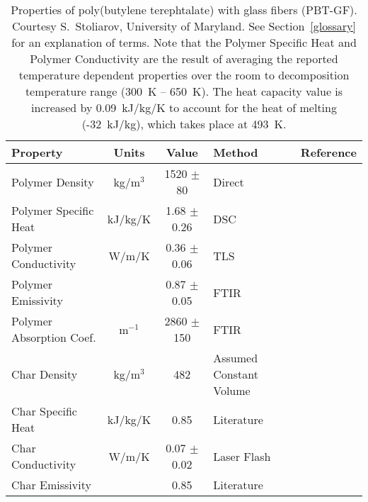 \begin{table}[h!]
\caption[Properties of poly(butylene terephtalate) with glass fibers (PBT-GF).]{Properties of poly(butylene terephtalate) with glass fibers (PBT-GF).
Courtesy S.~Stoliarov, University of Maryland. See Section~\ref{glossary} for an explanation of terms. Note that the Polymer Specific Heat and Polymer Conductivity
are the result of averaging the reported temperature dependent properties over the room to decomposition temperature range (300~K -- 650~K).
The heat capacity value is increased by 0.09~kJ/kg/K to account for the heat of melting (-32~kJ/kg), which takes place at 493~K.}
\begin{center}
\begin{tabular}{|l|c|c|l|l|}
\hline
Property                &      Units    &      Value                        & Method                                    & Reference                     \\ \hline \hline
Polymer Density         &     kg/m$^3$  & 1520 $\pm$ 80                     & Direct                                    & \cite{Kempel:1}               \\ \hline
Polymer Specific Heat   &    kJ/kg/K    & 1.68 $\pm$ 0.26                   & DSC                                       & \cite{Kempel:1}               \\ \hline
Polymer Conductivity    &      W/m/K    & 0.36 $\pm$ 0.06                   & TLS                                       & \cite{Kempel:1}               \\ \hline
Polymer Emissivity      &               & 0.87 $\pm$ 0.05                   & FTIR                                      & \cite{Linteris:2}             \\ \hline
Polymer Absorption Coef.&  m$^{-1}$     & 2860 $\pm$ 150                    & FTIR                                      & \cite{Linteris:2}             \\ \hline
Char Density            &     kg/m$^3$  &        482                        & Assumed Constant Volume                   & \cite{Kempel:1}               \\ \hline
Char Specific Heat      &    kJ/kg/K    &        0.85                       & Literature                                & \cite{SCHOTT}                 \\ \hline
Char Conductivity       &      W/m/K    & 0.07 $\pm$ 0.02                   & Laser Flash                               & \cite{Kempel:1}               \\ \hline
Char Emissivity         &               &       0.85                        & Literature                                & \cite{Braeuer:1}              \\ \hline

\end{tabular}
\end{center}
\end{table}
